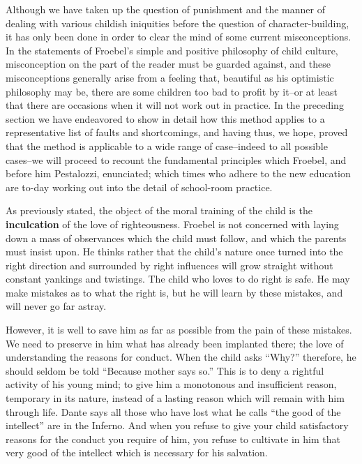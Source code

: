 \bigskip
\begin{linenumbers}
\modulolinenumbers[5]
\indent Although we have taken up the question of punishment and the manner of dealing with various childish iniquities before the question of character-building, it has only been done in order to clear the mind of some current misconceptions. In the statements of Froebel's simple and positive philosophy of child culture, misconception on the part of the reader must be guarded against, and these misconceptions generally arise from a feeling that, beautiful as his optimistic philosophy may be, there are some children too bad to profit by it--or at least that there are occasions when it will not work out in practice. In the preceding section we have endeavored to show in detail how this method applies to a representative list of faults and shortcomings, and having thus, we hope, proved that the method is applicable to a wide range of case--indeed to all possible cases--we will proceed to recount the fundamental principles which Froebel, and before him Pestalozzi, enunciated; which times who adhere to the new education are to-day working out into the detail of school-room practice.

\indent  As previously stated, the object of the moral training of the child is the \textbf{inculcation} of the love of righteousness. Froebel is not concerned with laying down a mass of observances which the child must follow, and which the parents must insist upon. He thinks rather that the child's nature once turned into the right direction and surrounded by right influences will grow straight without constant yankings and twistings. The child who loves to do right is safe. He may make mistakes as to what the right is, but he will learn by these mistakes, and will never go far astray.

\indent However, it is well to save him as far as possible from the pain of these mistakes. We need to preserve in him what has already been implanted there; the love of understanding the reasons for conduct. When the child asks ``Why?'' therefore, he should seldom be told ``Because mother says so.'' This is to deny a rightful activity of his young mind; to give him a monotonous and insufficient reason, temporary in its nature, instead of a lasting reason which will remain with him through life. Dante says all those who have lost what he calls ``the good of the intellect'' are in the Inferno. And when you refuse to give your child satisfactory reasons for the conduct you require of him, you refuse to cultivate in him that very good of the intellect which is necessary for his salvation.


\end{linenumbers}

